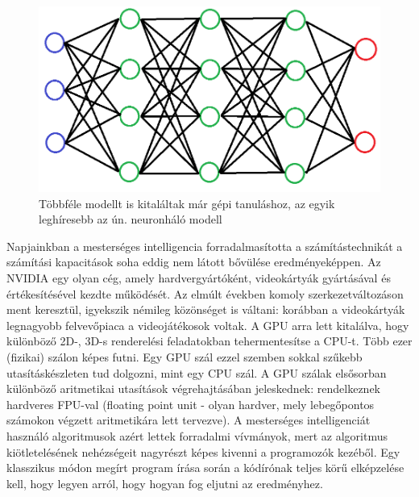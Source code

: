 \begin{figure}[ht!]
	\centering
	\includegraphics[width=150mm, keepaspectratio]{figures/neurons.png}
	\caption{Többféle modellt is kitaláltak már gépi tanuláshoz, az egyik leghíresebb az ún. neuronháló modell }
\end{figure}
Napjainkban a mesterséges intelligencia forradalmasította a számítástechnikát a számítási kapacitások soha eddig nem látott bővülése eredményeképpen. Az NVIDIA egy olyan cég, amely hardvergyártóként, videokártyák gyártásával és értékesítésével kezdte működését. Az elmúlt években komoly szerkezetváltozáson ment keresztül, igyekszik némileg közönséget is váltani: korábban a videokártyák legnagyobb felvevőpiaca a videojátékosok voltak. A GPU arra lett kitalálva, hogy különböző 2D-, 3D-s renderelési feladatokban tehermentesítse a CPU-t. Több ezer (fizikai) szálon képes futni. Egy GPU szál ezzel szemben sokkal szűkebb utasításkészleten tud dolgozni, mint egy CPU szál. A GPU szálak elsősorban különböző aritmetikai utasítások végrehajtásában jeleskednek: rendelkeznek hardveres FPU-val (floating point unit - olyan hardver, mely lebegőpontos számokon végzett aritmetikára lett tervezve). 
A mesterséges intelligenciát használó algoritmusok azért lettek forradalmi vívmányok, mert az algoritmus kiötletelésének nehézségeit nagyrészt képes kivenni a programozók kezéből. Egy klasszikus módon megírt program írása során a kódírónak teljes körű elképzelése kell, hogy legyen arról, hogy hogyan fog eljutni az eredményhez. 



